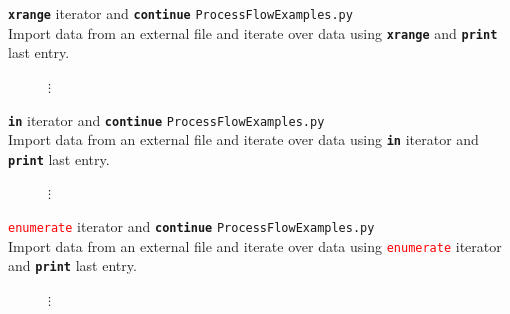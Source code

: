 \documentclass[t]{beamer}
\begin{document}
\begin{frame}{\texttt{\textbf{xrange}} iterator and \texttt{\textbf{continue}}}
\texttt{ProcessFlowExamples.py} \\ Import data from an external file and iterate over data using \texttt{\textbf{xrange}}  and \texttt{\textbf{print}}  last entry.
  \begin{figure}[ht]
  \centering
        \lstset{numbers=left}
        
       $\vdots$
        
   \end{figure}
\end{frame}

\begin{frame}{\texttt{\textbf{in}} iterator and \texttt{\textbf{continue}}}
\texttt{ProcessFlowExamples.py} \\ Import data from an external file and iterate over data using \texttt{\textbf{in}} iterator and \texttt{\textbf{print}}  last entry.
  \begin{figure}[ht]
  \centering
        \lstset{numbers=left}
        
       $\vdots$
        
   \end{figure}
\end{frame}

\begin{frame}{\texttt{\textcolor{red}{enumerate}} iterator and \texttt{\textbf{continue}}}
\texttt{ProcessFlowExamples.py} \\ Import data from an external file and iterate over data using \texttt{\textcolor{red}{enumerate}} iterator and \texttt{\textbf{print}}  last entry.
  \begin{figure}[ht]
  \centering
        \lstset{numbers=left}
        
       $\vdots$
        
   \end{figure}
\end{frame}
\end{document}
